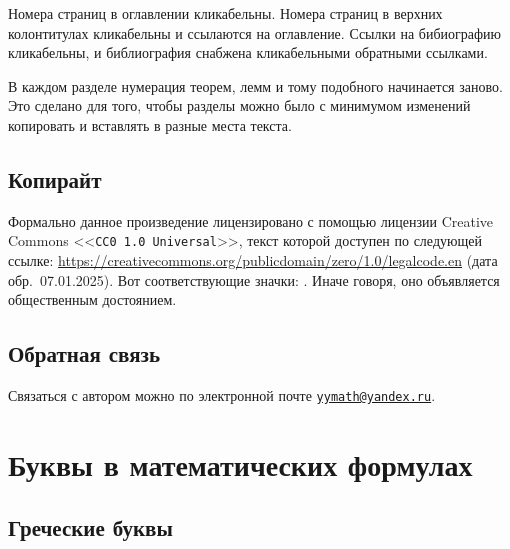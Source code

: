 \documentclass[
	extrafontsizes,
	11pt,
	hyphens,
]{memoir}
\begin{document}
Номера страниц в оглавлении кликабельны.
Номера страниц в верхних колонтитулах кликабельны и ссылаются на оглавление.
Ссылки на бибиографию кликабельны, и библиография снабжена кликабельными обратными ссылками.

В каждом разделе нумерация теорем, лемм и тому подобного начинается заново. Это сделано для того, чтобы разделы можно было с минимумом изменений копировать и вставлять в разные места текста.

\subsection{Копирайт}


Формально данное произведение лицензировано с помощью лицензии
\textenglish{Creative Commons <<\texttt{CC0 1.0 Universal}>>},
текст которой доступен по следующей ссылке:
\url{https://creativecommons.org/publicdomain/zero/1.0/legalcode.en} (дата обр.\ 07.01.2025).
Вот соответствующие значки: \cczero.
Иначе говоря, оно объявляется общественным достоянием.

\subsection{Обратная связь}

Связаться с автором можно по электронной почте
\href{mailto:yymath@yandex.ru}{\nolinkurl{yymath@yandex.ru}}.


\section{Буквы в математических формулах}

\subsection{Греческие буквы}
\end{document}
